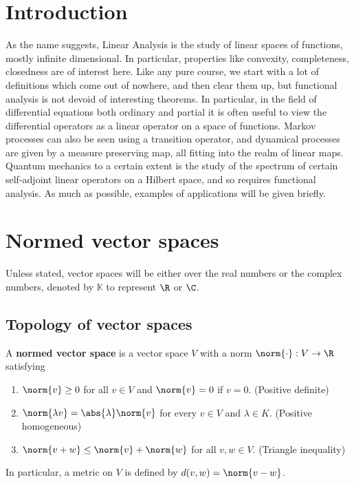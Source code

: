 \documentclass{article}
\newcommand{\K}{\mathbb{K}}
\begin{document}
\maketitle

\tableofcontents

\clearpage
\section{Introduction}
As the name suggests, Linear Analysis is the study of linear spaces of functions, mostly infinite dimensional. In particular, properties like convexity, completeness, closedness are of interest here.
Like any pure course, we start with a lot of definitions which come out of nowhere, and then clear them up, but functional analysis is not devoid of interesting theorems.
In particular, in the field of differential equations both ordinary and partial it is often useful to view the differential operators as a linear operator on a space of functions.
Markov processes can also be seen using a transition operator, and dynamical processes are given by a measure preserving map, all fitting into the realm of linear maps.
Quantum mechanics to a certain extent is the study of the spectrum of certain self-adjoint linear operators on a Hilbert space, and so requires functional analysis.
As much as possible, examples of applications will be given briefly.

\section{Normed vector spaces}
Unless stated, vector spaces will be either over the real numbers or the complex numbers, denoted by $\K$ to represent $\R$ or $\C$.

\subsection{Topology of vector spaces}
\begin{defi}
    A \textbf{normed vector space} is a vector space $V$ with a norm $\norm{\cdot}: V \to \R$ satisfying
    \begin{enumerate}[label=\roman*.]
        \item $\norm{v} \geq 0$ for all $v \in V$ and $\norm{v} = 0$ if $v=0$. (Positive definite)
        \item $\norm{\lambda v} = \abs{\lambda} \norm{v}$ for every $v \in V$ and $\lambda \in K$. (Positive homogeneous)
        \item $\norm{v + w} \leq \norm{v} + \norm{w}$ for all $v, w \in V$. (Triangle inequality)
    \end{enumerate}
\end{defi}
In particular, a metric on $V$ is defined by $d(v, w) = \norm{v - w}$.
\end{document}
